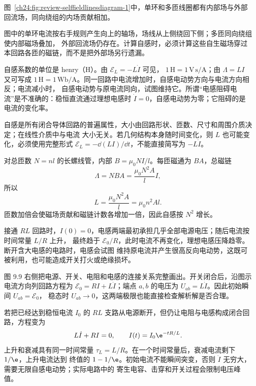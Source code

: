图~\ref{ch24:fig:review-selffieldlinesdiagram-1}中，单环和多匝线圈都有内部场与外部回流场，同向绕组的内场贡献相加。
\par\noindent\begin{minipage}{\linewidth}
\selfFieldLinesDiagram
{}\label{ch24:fig:review-selffieldlinesdiagram-1}
\end{minipage}\par\medskip
图中的单环电流按右手规则产生向上的轴场，场线从上侧绕回下侧；多匝同向绕组使内部磁场叠加，
外部回流场仍存在。计算自感时，必须计算这些自生磁场穿过本回路各匝的磁链，而不是把外部场另行遗漏。

自感系数的单位是 henry（H）。由 $\mathcal E_L=-L\dot I$ 可见，
$1\,\mathrm H=1\,\mathrm{V\,s/A}$；由 $\Lambda=LI$ 又可写成
$1\,\mathrm H=1\,\mathrm{Wb/A}$。同一回路中电流增加时，自感电动势方向与电流方向相反；电流减小时，
自感电动势与原电流同向，试图维持它。所谓“电感阻碍电流”是不准确的：稳恒直流通过理想电感时
$\dot I=0$，自感电动势为零；它阻碍的是电流的变化率。

自感是所有闭合导体回路的普遍属性，大小由回路形状、匝数、尺寸和周围介质决定；在线性介质中与电流
大小无关。若几何结构本身随时间变化，则 $L$ 也可能变化，必须使用完整形式
$\mathcal E_L=-\dd(LI)/\dd t$，不能直接简写为 $-L\dot I$。

对总匝数 $N=nl$ 的长螺线管，内部 $B=\mu_0NI/l$。每匝磁通为 $BA$，总磁链
\begin{equation}
  \Lambda=NBA=\frac{\mu_0N^2A}{l}I,
\end{equation}
所以
\begin{equation}
  L=\frac{\mu_0N^2A}{l}=\mu_0n^2Al.
\end{equation}
匝数加倍会使磁场贡献和磁链计数各增加一倍，因此自感按 $N^2$ 增长。

接通 $RL$ 回路时，$I(0)=0$，电感两端最初承担几乎全部电源电压；随后电流按时间常量 $L/R$ 上升，
最终趋于 $\mathcal E_0/R$，此时电流不再变化，理想电感压降趋零。断开含大电感的电路时，电感会试图
维持原电流并产生很高反向电动势，这既可被利用，也可能造成开关打火或绝缘损坏。

图 9.9 右侧把电源、开关、电阻和电感的连接关系完整画出。开关闭合后，沿图示电流方向列回路方程为
$\mathcal E_0=RI+L\dot I$；端点 $a,b$ 的电压为 $U_{ab}=L\dot I$。因此初始瞬间 $U_{ab}=\mathcal E_0$，
稳态时 $U_{ab}\to0$，这两端极限也能直接检查解析解是否合理。

\rlInductorContext

若把已经达到稳恒电流 $I_0$ 的 $RL$ 支路从电源断开，但仍让电阻与电感构成闭合回路，方程变为
\begin{equation}
  L\dot I+RI=0,\qquad I(t)=I_0\e^{-tR/L}.
\end{equation}
上升和衰减具有同一时间常量 $\tau_L=L/R$。在一个时间常量后，衰减电流剩下 $1/\e$，上升电流达到
终值的 $1-1/\e$。初始电流不能瞬间突变，否则 $\dot I$ 无穷大，需要无限自感电动势；实际电路中的
寄生电容、击穿和开关过程会限制电压峰值。

